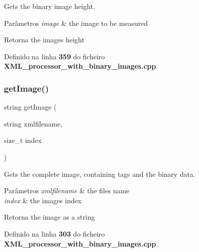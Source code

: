 Gets the binary image height. 


\begin{DoxyParams}{Parâmetros}
{\em image} & the image to be measured \\
\hline
\end{DoxyParams}
\begin{DoxyReturn}{Retorna}
the image\textquotesingle{}s height 
\end{DoxyReturn}


Definido na linha \textbf{ 359} do ficheiro \textbf{ X\+M\+L\+\_\+processor\+\_\+with\+\_\+binary\+\_\+images.\+cpp}.

\mbox{\label{_x_m_l__processor__with__binary__images_8cpp_a3ad6079ed7ff0f7088dee883421b5a95}} 
\subsubsection{get\+Image()}
{\footnotesize\ttfamily string get\+Image (\begin{DoxyParamCaption}\item[{string}]{xmlfilename,  }\item[{size\+\_\+t}]{index }\end{DoxyParamCaption})}



Gets the complete image, containing tags and the binary data. 


\begin{DoxyParams}{Parâmetros}
{\em xmlfilename} & the file\textquotesingle{}s name \\
\hline
{\em index} & the image\textquotesingle{}s index \\
\hline
\end{DoxyParams}
\begin{DoxyReturn}{Retorna}
the image as a string 
\end{DoxyReturn}


Definido na linha \textbf{ 303} do ficheiro \textbf{ X\+M\+L\+\_\+processor\+\_\+with\+\_\+binary\+\_\+images.\+cpp}.

\mbox{\label{_x_m_l__processor__with__binary__images_8cpp_a27cae01ba0e58207d09b9c9a7c5266d3}} 
